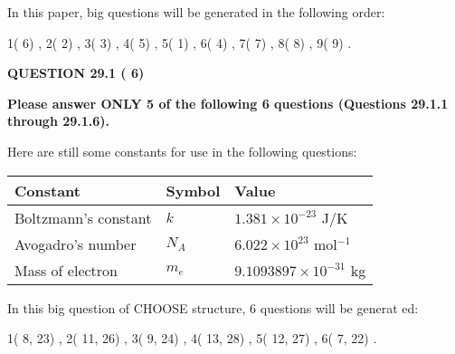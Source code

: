 \documentclass[12pt]{article}
\begin{document}
\vspace{0.3in}
 
 
   
   
   
\vspace{0.2in}
   
In this paper, big questions will be generated in the following order: 
   
   
            1(          6)
 ,
            2(          2)
 ,
            3(          3)
 ,
            4(          5)
 ,
            5(          1)
 ,
            6(          4)
 ,
            7(          7)
 ,
            8(          8)
 ,
            9(          9)
 .
  
\vspace{0.2in}
  
{\textbf{\Large{QUESTION
29.1 
 (          6)
}}}
  
  
 
{\textbf{\Large{Please answer ONLY
5 of the following
6 questions (Questions
29.1.1 through
29.1.6). }}}
 
Here are still some constants for use in the following questions:
 
 
\noindent\begin{tabular}{|l|l|l|}
\hline
Constant & Symbol & Value \\
\hline
 
Boltzmann's constant &
$k$ &
 $ 1.381 \times 10^{-23} $
J/K \\
\hline
 
Avogadro's number &
$N_A$ &
 $ 6.022 \times 10^{23} $
mol$^{-1}$ \\
\hline
 
Mass of electron &
$m_e$ &
 $ 9.1093897 \times 10^{-31} $
kg \\
\hline
 
\end{tabular}
 
   
\vspace{0.2in}
   
 In this big question of CHOOSE structure,           6 questions will be generat
 ed: 
  
  
            1(          8,         23)
 ,
            2(         11,         26)
 ,
            3(          9,         24)
 ,
            4(         13,         28)
 ,
            5(         12,         27)
 ,
            6(          7,         22)
 .
  
\vspace{0.2in}
  
\end{document}
